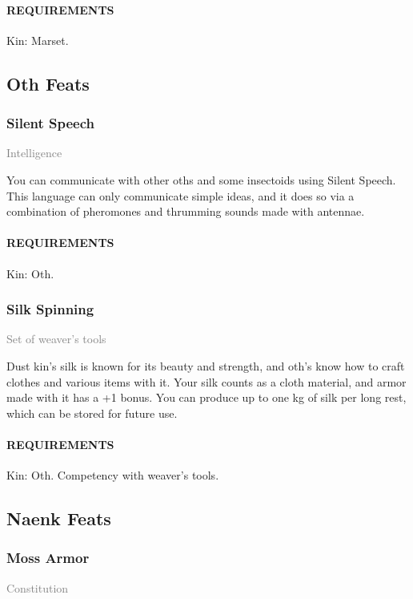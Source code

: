     \paragraph{REQUIREMENTS} Kin: Marset.

\subsection*{Oth Feats}
    \subsubsection{Silent Speech} \label{feat::silentspeech}
    \small{\textcolor{gray}{Intelligence}}

    \normalsize
    You can communicate with other oths and some insectoids using Silent Speech.
    This language can only communicate simple ideas, and it does so via a combination of pheromones and thrumming sounds made with antennae.
    \paragraph{REQUIREMENTS} Kin: Oth.

    \subsubsection{Silk Spinning} \label{feat::silkspinning}
    \small{\textcolor{gray}{Set of weaver's tools}}

    \normalsize
    Dust kin's silk is known for its beauty and strength, and oth's know how to craft clothes and various items with it.
    Your silk counts as a cloth material, and armor made with it has a +1 bonus.
    You can produce up to one kg of silk per long rest, which can be stored for future use.
    \paragraph{REQUIREMENTS} Kin: Oth. Competency with weaver's tools.

\subsection*{Naenk Feats}
    \subsubsection{Moss Armor} \label{feat::mossarmor}
    \small{\textcolor{gray}{Constitution}}

